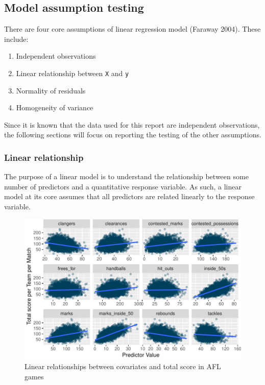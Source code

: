 \documentclass{article}
\begin{document}
\hypertarget{model-assumption-testing}{%
\subsection{Model assumption testing}\label{model-assumption-testing}}

There are four core assumptions of linear regression model (Faraway
2004). These include:

\begin{enumerate}
\def\labelenumi{\arabic{enumi}.}
\tightlist
\item
  Independent observations
\item
  Linear relationship between \texttt{X} and \texttt{y}
\item
  Normality of residuals
\item
  Homogeneity of variance
\end{enumerate}

Since it is known that the data used for this report are independent
observations, the following sections will focus on reporting the testing
of the other assumptions.

\hypertarget{linear-relationship}{%
\subsubsection{Linear relationship}\label{linear-relationship}}

The purpose of a linear model is to understand the relationship between
some number of predictors and a quantitative response variable. As such,
a linear model at its core assumes that all predictors are related
linearly to the response variable.

\begin{figure}
\centering
\includegraphics{OLET5608_TrentHenderson_files/figure-latex/unnamed-chunk-4-1.pdf}
\caption{Linear relationships between covariates and total score in AFL
games}
\end{figure}
\end{document}
